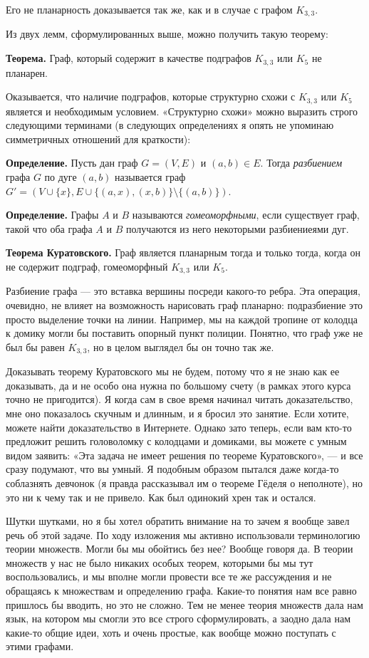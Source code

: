 Его не планарность доказывается так же, как и в случае с графом $K_{3, 3}$.

Из двух лемм, сформулированных выше, можно получить такую теорему:

{\bfseries Теорема.} Граф, который содержит в качестве подграфов $K_{3, 3}$ или $K_5$ не планарен.

Оказывается, что наличие подграфов, которые структурно схожи с $K_{3, 3}$ или $K_5$ является и необходимым условием. «Структурно схожи» можно выразить строго следующими терминами (в следующих определениях я опять не упоминаю симметричных отношений для краткости):

{\bfseries Определение.} Пусть дан граф $G=(V, E)$ и $(a, b) \in E$. Тогда {\slshape разбиением} графа $G$ по дуге $(a, b)$ называется граф $G' = (V\cup\{x\}, E\cup\{(a, x), (x, b)\}\setminus\{(a, b)\})$.

{\bfseries Определение.} Графы $A$ и $B$ называются {\slshape гомеоморфными}, если существует граф, такой что оба графа $A$ и $B$ получаются из него некоторыми разбиениеями дуг.

{\bfseries Теорема Куратовского.} Граф является планарным тогда и только тогда, когда он не содержит подграф, гомеоморфный $K_{3, 3}$ или $K_5$.

Разбиение графа — это вставка вершины посреди какого-то ребра. Эта операция, очевидно, не влияет на возможность нарисовать граф планарно: подразбиение это просто выделение точки на линии. Например, мы на каждой тропине от колодца к домику могли бы поставить опорный пункт полиции. Понятно, что граф уже не был бы равен $K_{3, 3}$, но в целом выглядел бы он точно так же.

Доказывать теорему Куратовского мы не будем, потому что я не знаю как ее доказывать, да и не особо она нужна по большому счету (в рамках этого курса точно не пригодится). Я когда сам в свое время начинал читать доказательство, мне оно показалось скучным и длинным, и я бросил это занятие. Если хотите, можете найти доказательство в Интернете. Однако зато теперь, если вам кто-то предложит решить головоломку с колодцами и домиками, вы можете с умным видом заявить: «Эта задача не имеет решения по теореме Куратовского», — и все сразу подумают, что вы умный. Я подобным образом пытался даже когда-то соблазнять девчонок (я правда рассказывал им о теореме Гёделя о неполноте), но это ни к чему так и не привело. Как был одинокий хрен так и остался.

Шутки шутками, но я бы хотел обратить внимание на то зачем я вообще завел речь об этой задаче. По ходу изложения мы активно использовали терминологию теории множеств. Могли бы мы обойтись без нее? Вообще говоря да. В теории множеств у нас не было никаких особых теорем, которыми бы мы тут воспользовались, и мы вполне могли провести все те же рассуждения и не обращаясь к множествам и определению графа. Какие-то понятия нам все равно пришлось бы вводить, но это не сложно. Тем не менее теория множеств дала нам язык, на котором мы смогли это все строго сформулировать, а заодно дала нам какие-то общие идеи, хоть и очень простые, как вообще можно поступать с этими графами.

